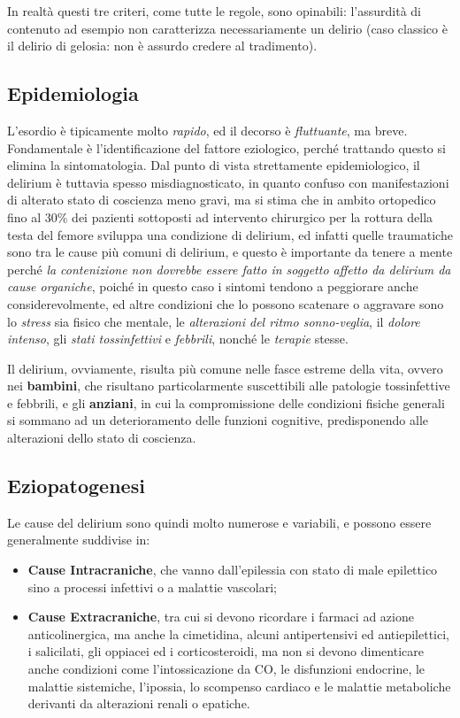 \begin{itemize}
In realtà questi tre criteri, come tutte le regole, sono opinabili:
l'assurdità di contenuto ad esempio non caratterizza necessariamente un
delirio (caso classico è il delirio di gelosia: non è assurdo credere al
tradimento).

\end{itemize}

\subsection{Epidemiologia}

L'esordio è tipicamente molto \emph{rapido}, ed il decorso è
\emph{fluttuante}, ma breve. Fondamentale è l'identificazione del
fattore eziologico, perché trattando questo si elimina la
sintomatologia. Dal punto di vista strettamente epidemiologico, il
delirium è tuttavia spesso misdiagnosticato, in quanto confuso con
manifestazioni di alterato stato di coscienza meno gravi, ma si stima
che in ambito ortopedico fino al 30\% dei pazienti sottoposti ad
intervento chirurgico per la rottura della testa del femore sviluppa una
condizione di delirium, ed infatti quelle traumatiche sono tra le cause
più comuni di delirium, e questo è importante da tenere a mente perché
\emph{la contenizione non dovrebbe essere fatto in soggetto affetto da
delirium da cause organiche}, poiché in questo caso i sintomi tendono a
peggiorare anche considerevolmente, ed altre condizioni che lo possono
scatenare o aggravare sono lo \emph{stress} sia fisico che mentale, le
\emph{alterazioni del ritmo sonno-veglia}, il \emph{dolore intenso}, gli
\emph{stati tossinfettivi} e \emph{febbrili}, nonché le \emph{terapie}
stesse.

Il delirium, ovviamente, risulta più comune nelle fasce estreme della
vita, ovvero nei \textbf{bambini}, che risultano particolarmente
suscettibili alle patologie tossinfettive e febbrili, e gli
\textbf{anziani}, in cui la compromissione delle condizioni fisiche
generali si sommano ad un deterioramento delle funzioni cognitive,
predisponendo alle alterazioni dello stato di coscienza.

\subsection{Eziopatogenesi}

Le cause del delirium sono quindi molto numerose e variabili, e possono
essere generalmente suddivise in:

\begin{itemize}
\item
  \textbf{Cause Intracraniche}, che vanno dall'epilessia con stato di
  male epilettico sino a processi infettivi o a malattie vascolari;
\item
  \textbf{Cause Extracraniche}, tra cui si devono ricordare i farmaci ad
  azione anticolinergica, ma anche la cimetidina, alcuni antipertensivi
  ed antiepilettici, i salicilati, gli oppiacei ed i corticosteroidi, ma
  non si devono dimenticare anche condizioni come l'intossicazione da
  CO, le disfunzioni endocrine, le malattie sistemiche, l'ipossia, lo
  scompenso cardiaco e le malattie metaboliche derivanti da alterazioni
  renali o epatiche.
\end{itemize}

